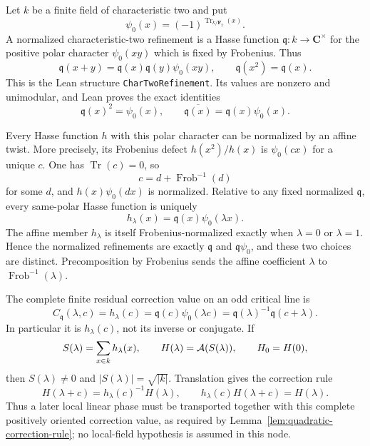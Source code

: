\begin{definition}
\label{mod:finitefield-chartworefinement}
Let $k$ be a finite field of characteristic two and put
\[
 \psi_0(x)=(-1)^{\operatorname{Tr}_{k/\mathbf F_2}(x)}.
\]
A normalized characteristic-two refinement is a Hasse function
$\mathfrak q:k\to\mathbf C^\times$ for the positive polar character
$\psi_0(xy)$ which is fixed by Frobenius.  Thus
\[
 \mathfrak q(x+y)=\mathfrak q(x)\mathfrak q(y)\psi_0(xy),
 \qquad
 \mathfrak q(x^2)=\mathfrak q(x).
\]
This is the Lean structure \texttt{CharTwoRefinement}.  Its values are
nonzero and unimodular, and Lean proves the exact identities
\[
 \mathfrak q(x)^2=\psi_0(x),
 \qquad
 \overline{\mathfrak q(x)}
   =\mathfrak q(x)\psi_0(x).
\]

Every Hasse function $h$ with this polar character can be normalized
by an affine twist.  More precisely, its Frobenius defect
$h(x^2)/h(x)$ is $\psi_0(cx)$ for a unique $c$.  One has
$\operatorname{Tr}(c)=0$, so
\[
 c=d+\operatorname{Frob}^{-1}(d)
\]
for some $d$, and $h(x)\psi_0(dx)$ is normalized.  Relative to any
fixed normalized $\mathfrak q$, every same-polar Hasse function is
uniquely
\[
 h_\lambda(x)=\mathfrak q(x)\psi_0(\lambda x).
\]
The affine member $h_\lambda$ is itself Frobenius-normalized exactly
when $\lambda=0$ or $\lambda=1$.  Hence the normalized refinements are
exactly $\mathfrak q$ and $\mathfrak q\psi_0$, and these two choices
are distinct.  Precomposition by Frobenius sends the affine coefficient
$\lambda$ to $\operatorname{Frob}^{-1}(\lambda)$.

The complete finite residual correction value on an odd critical line is
\[
 C_{\mathfrak q}(\lambda,c)
 =h_\lambda(c)
 =\mathfrak q(c)\psi_0(\lambda c)
 =\mathfrak q(\lambda)^{-1}\mathfrak q(c+\lambda).
\]
In particular it is $h_\lambda(c)$, not its inverse or conjugate.  If
\[
 S(\lambda)=\sum_{x\in k}h_\lambda(x),
 \qquad
 H(\lambda)=\mathcal A(S(\lambda)),
 \qquad H_0=H(0),
\]
then $S(\lambda)\ne0$ and
$|S(\lambda)|=\sqrt{|k|}$.  Translation gives the correction rule
\[
 H(\lambda+c)=h_\lambda(c)^{-1}H(\lambda),
 \qquad
 h_\lambda(c)H(\lambda+c)=H(\lambda).
\]
Thus a later local linear phase must be transported together with this
complete positively oriented correction value, as required by
Lemma~\ref{lem:quadratic-correction-rule}; no local-field hypothesis is
assumed in this node.


\end{definition}
